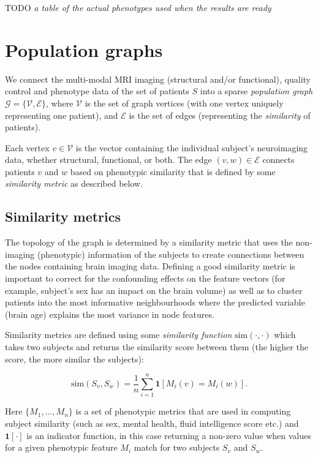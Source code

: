 TODO \textit{a table of the actual phenotypes used when the results are ready}

\section{Population graphs}

We connect the multi-modal MRI imaging (structural and/or functional), quality control and phenotype data of the set of patients $S$ into a sparse \textit{population graph} $\mathcal{G} = \{\mathcal{V}, \mathcal{E}\}$, where $\mathcal{V}$ is the set of graph vertices (with one vertex uniquely representing one patient), and $\mathcal{E}$ is the set of edges (representing the \textit{similarity} of patients).

Each vertex $v \in \mathcal{V}$ is the vector containing the individual subject's neuroimaging data, whether structural, functional, or both. The edge $(v, w) \in \mathcal{E}$ connects patients $v$ and $w$ based on phenotypic similarity that is defined by some \textit{similarity metric} as described below.

\subsection{Similarity metrics}
The topology of the graph is determined by a similarity metric that uses the non-imaging (phenotypic) information of the subjects to create connections between the nodes containing brain imaging data. Defining a good similarity metric is important to correct for the confounding effects on the feature vectors (for example, subject's sex has an impact on the brain volume) as well as to cluster patients into the most informative neighbourhoods where the predicted variable (brain age) explains the most variance in node features.

Similarity metrics are defined using some \textit{similarity function} $\mathrm{sim}(\cdot, \cdot)$ which takes two subjects and returns the similarity score between them (the higher the score, the more similar the subjects):

\begin{equation}
    \mathrm{sim}(S_v, S_w) = \frac{1}{n}\sum_{i=1}^{n} \mathbf{1}[M_i(v) = M_i(w)].
\end{equation}

Here $\{M_1, \dots, M_n\}$ is a set of phenotypic metrics that are used in computing subject similarity (such as sex, mental health, fluid intelligence score etc.) and $\mathbf{1}[\cdot]$ is an indicator function, in this case returning a non-zero value when values for a given phenotypic feature $M_i$ match for two subjects $S_v$ and $S_w$.

